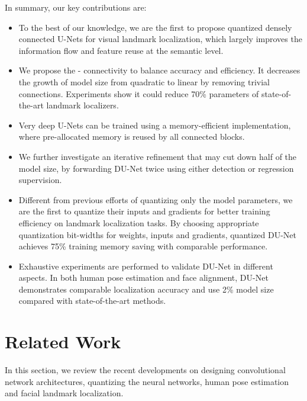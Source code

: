 \documentclass[runningheads]{llncs}
\begin{document}
In summary, our key contributions are:
\begin{itemize}
    \item To the best of our knowledge, we are the first to propose quantized densely connected U-Nets for visual landmark localization, which largely improves the information flow and feature reuse at the semantic level.
    \item We propose the - connectivity to balance accuracy and efficiency. It decreases the growth of model size from quadratic to linear by removing trivial connections. Experiments show it could reduce 70\% parameters of state-of-the-art landmark localizers.
    \item Very deep U-Nets can be trained using a memory-efficient implementation, where pre-allocated memory is reused by all connected blocks.
    \item We further investigate an iterative refinement that may cut down half of the model size, by forwarding DU-Net twice using either detection or regression supervision.
\item Different from previous efforts of quantizing only the model parameters, we are the first to quantize their inputs and gradients for better training efficiency on landmark localization tasks. By choosing appropriate quantization bit-widths for weights, inputs and gradients, quantized DU-Net achieves 75\% training memory saving with comparable performance. 
\item Exhaustive experiments are performed to validate DU-Net in different aspects. In both human pose estimation and face alignment, DU-Net demonstrates comparable localization accuracy and use 2\% model size compared with state-of-the-art methods.
\end{itemize}


























%
 \section{Related Work}
In this section, we review the recent developments on designing convolutional network architectures, quantizing the neural networks, human pose estimation and facial landmark localization.
\end{document}

